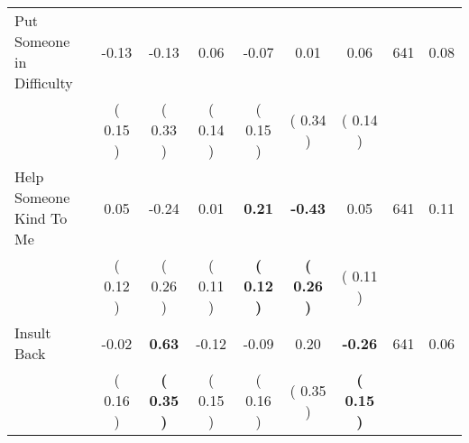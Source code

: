 \begin{tabular}{lcccccccc}
Put Someone in Difficulty &     -0.13 &     -0.13 &      0.06 &     -0.07 &      0.01 &      0.06 & 641 &       0.08 \\ 
 & (     0.15 ) & (     0.33 ) & (     0.14 ) & (     0.15 ) & (     0.34 ) & (     0.14 ) & \\
Help Someone Kind To Me &      0.05 &     -0.24 &      0.01 & \textbf{     0.21} & \textbf{    -0.43} &      0.05 & 641 &       0.11 \\ 
 & (     0.12 ) & (     0.26 ) & (     0.11 ) & \textbf{(     0.12 )} & \textbf{(     0.26 )} & (     0.11 ) & \\
Insult Back &     -0.02 & \textbf{     0.63} &     -0.12 &     -0.09 &      0.20 & \textbf{    -0.26} & 641 &       0.06 \\ 
 & (     0.16 ) & \textbf{(     0.35 )} & (     0.15 ) & (     0.16 ) & (     0.35 ) & \textbf{(     0.15 )} & \\
\bottomrule
\end{tabular}
